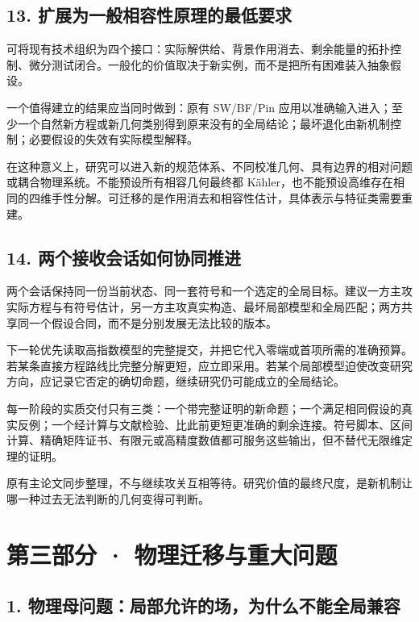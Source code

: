 \documentclass[UTF8,a4paper,11pt,fontset=fandol]{ctexart}
\begin{document}
\subsection{13.
扩展为一般相容性原理的最低要求}\label{ux6269ux5c55ux4e3aux4e00ux822cux76f8ux5bb9ux6027ux539fux7406ux7684ux6700ux4f4eux8981ux6c42}

可将现有技术组织为四个接口：实际解供给、背景作用消去、剩余能量的拓扑控制、微分测试闭合。一般化的价值取决于新实例，而不是把所有困难装入抽象假设。

一个值得建立的结果应当同时做到：原有 SW/BF/Pin
应用以准确输入进入；至少一个自然新方程或新几何类别得到原来没有的全局结论；最坏退化由新机制控制；必要假设的失效有实际模型解释。

在这种意义上，研究可以进入新的规范体系、不同校准几何、具有边界的相对问题或耦合物理系统。不能预设所有相容几何最终都
Kähler，也不能预设高维存在相同的四维手性分解。可迁移的是作用消去和相容性估计，具体表示与特征类需要重建。

\subsection{14.
两个接收会话如何协同推进}\label{ux4e24ux4e2aux63a5ux6536ux4f1aux8bddux5982ux4f55ux534fux540cux63a8ux8fdb}

两个会话保持同一份当前状态、同一套符号和一个选定的全局目标。建议一方主攻实际方程与有符号估计，另一方主攻真实构造、最坏局部模型和全局匹配；两方共享同一个假设合同，而不是分别发展无法比较的版本。

下一轮优先读取高指数模型的完整提交，并把它代入零端或首项所需的准确预算。若某条直接方程路线比完整分解更短，应立即采用。若某个局部模型迫使改变研究方向，应记录它否定的确切命题，继续研究仍可能成立的全局结论。

每一阶段的实质交付只有三类：一个带完整证明的新命题；一个满足相同假设的真实反例；一个经计算与文献检验、比此前更短更准确的剩余连接。符号脚本、区间计算、精确矩阵证书、有限元或高精度数值都可服务这些输出，但不替代无限维定理的证明。

原有主论文同步整理，不与继续攻关互相等待。研究价值的最终尺度，是新机制让哪一种过去无法判断的几何变得可判断。

\clearpage
\section{第三部分 ·
物理迁移与重大问题}\label{ux7b2cux4e09ux90e8ux5206-ux7269ux7406ux8fc1ux79fbux4e0eux91cdux5927ux95eeux9898}

\subsection{1.
物理母问题：局部允许的场，为什么不能全局兼容}\label{ux7269ux7406ux6bcdux95eeux9898ux5c40ux90e8ux5141ux8bb8ux7684ux573aux4e3aux4ec0ux4e48ux4e0dux80fdux5168ux5c40ux517cux5bb9}
\end{document}
